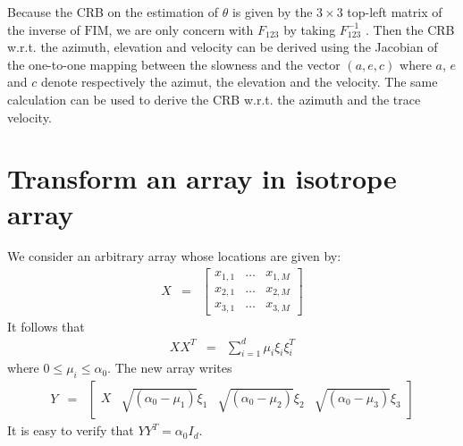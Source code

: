 \documentclass[a4paper, 12pt]{report}
\def\fim{\mathrm{FIM}}
\begin{document}
Because the CRB on the estimation of $\theta$ is given by the $3\times 3$ top-left matrix of the inverse of $\fim$, we are only concern with $ F_{123}$ by taking $ F_{123}^{-1}$ . Then the CRB w.r.t. the azimuth, elevation and velocity can be derived using the Jacobian of the one-to-one mapping between the slowness and the vector $(a,e,c)$ where $a$, $e$ and $c$ denote respectively the azimut, the elevation and the velocity. The same calculation can be used to derive the CRB w.r.t. the azimuth and the trace velocity.


\appendix
\chapter{Transform an array in isotrope array}
We consider an arbitrary  array whose locations are given by:
\begin{eqnarray*}
X&=&\begin{bmatrix}
x_{1,1}&\ldots&x_{1,M}
\\
x_{2,1}&\ldots&x_{2,M}
\\
x_{3,1}&\ldots&x_{3,M}
\end{bmatrix}
\end{eqnarray*}
It follows that
\begin{eqnarray*}
 XX^{T}&=&
 \sum_{i=1}^{d}\mu_{i}\xi_{i}\xi^{T}_{i}
\end{eqnarray*}
where $0\leq \mu_{i}\leq \alpha_{0}$. The new array writes
\begin{eqnarray*}
Y &=& \begin{bmatrix}
X&\sqrt{(\alpha_{0}-\mu_{1})}\xi_{1}&\sqrt{(\alpha_{0}-\mu_{2})}\xi_{2}&\sqrt{(\alpha_{0}-\mu_{3})}\xi_{3}
\end{bmatrix}
\end{eqnarray*}
It is easy to verify that $YY^{T}=\alpha_{0}I_{d}$.

\end{document}
